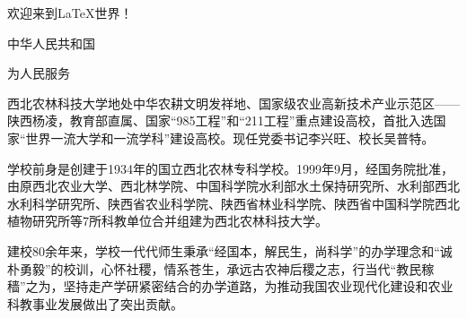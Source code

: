 \documentclass{ctexart}
\begin{document}
欢迎来到\LaTeX 世界！

中华人民共和国

为人民服务

西北农林科技大学地处中华农耕文明发祥地、国家级农业高新技术产业示范区——陕西杨凌，教育部直属、国家“985工程”和“211工程”重点建设高校，首批入选国家“世界一流大学和一流学科”建设高校。现任党委书记李兴旺、校长吴普特。

学校前身是创建于1934年的国立西北农林专科学校。1999年9月，经国务院批准，由原西北农业大学、西北林学院、中国科学院水利部水土保持研究所、水利部西北水利科学研究所、陕西省农业科学院、陕西省林业科学院、陕西省中国科学院西北植物研究所等7所科教单位合并组建为西北农林科技大学。

建校80余年来，学校一代代师生秉承“经国本，解民生，尚科学”的办学理念和“诚朴勇毅”的校训，心怀社稷，情系苍生，承远古农神后稷之志，行当代“教民稼穑”之为，坚持走产学研紧密结合的办学道路，为推动我国农业现代化建设和农业科教事业发展做出了突出贡献。
\end{document}
